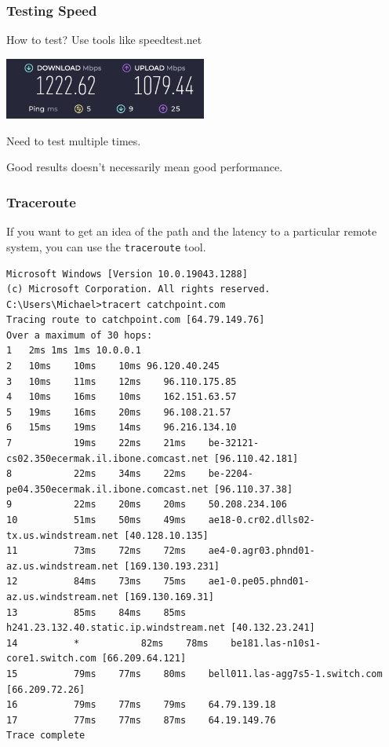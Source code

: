 \begin{frame}
\frametitle{Testing Speed}

How to test? Use tools like speedtest.net

\begin{center}
  \includegraphics[width=0.5\textwidth]{images/speedtest.png}
\end{center}

Need to test multiple times.

Good results doesn't necessarily mean good performance.

\end{frame}

\begin{frame}[fragile]
\frametitle{Traceroute}

If you want to get an idea of the path and the latency to a particular remote system, you can use the \texttt{traceroute} tool.

{\scriptsize
\begin{verbatim}
Microsoft Windows [Version 10.0.19043.1288]
(c) Microsoft Corporation. All rights reserved.
C:\Users\Michael>tracert catchpoint.com
Tracing route to catchpoint.com [64.79.149.76]
Over a maximum of 30 hops: 
1	2ms	1ms	1ms 10.0.0.1
2 	10ms	10ms	10ms 96.120.40.245
3	10ms	11ms	12ms	96.110.175.85
4	10ms	16ms	10ms 	162.151.63.57
5	19ms	16ms	20ms	96.108.21.57
6	15ms	19ms	14ms	96.216.134.10
7          	19ms 	22ms 	21ms 	be-32121-cs02.350ecermak.il.ibone.comcast.net [96.110.42.181]
8          	22ms 	34ms 	22ms 	be-2204-pe04.350ecermak.il.ibone.comcast.net [96.110.37.38]
9          	22ms 	20ms 	20ms 	50.208.234.106
10       	51ms 	50ms 	49ms 	ae18-0.cr02.dlls02-tx.us.windstream.net [40.128.10.135]
11       	73ms 	72ms 	72ms 	ae4-0.agr03.phnd01-az.us.windstream.net [169.130.193.231]
12       	84ms 	73ms 	75ms 	ae1-0.pe05.phnd01-az.us.windstream.net [169.130.169.31]
13       	85ms 	84ms 	85ms 	h241.23.132.40.static.ip.windstream.net [40.132.23.241]
14       	*         	82ms 	78ms 	be181.las-n10s1-core1.switch.com [66.209.64.121]
15       	79ms 	77ms 	80ms 	bell011.las-agg7s5-1.switch.com [66.209.72.26]
16       	79ms 	77ms 	79ms 	64.79.139.18
17       	77ms 	77ms 	87ms 	64.19.149.76
Trace complete
\end{verbatim}
}

\end{frame}

